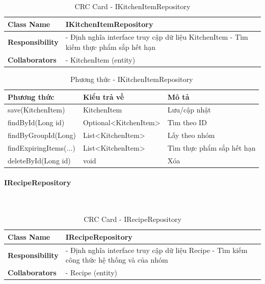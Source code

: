 \begin{table}[H]
\small
\renewcommand{\arraystretch}{1.3}
\begin{tabularx}{\textwidth}{|>{\raggedright\arraybackslash}p{3.5cm}|X|}
\hline
\rowcolor{gray!20}
\textbf{Class Name} & IKitchenItemRepository \\
\hline
\textbf{Responsibility} & - Định nghĩa interface truy cập dữ liệu KitchenItem \newline - Tìm kiếm thực phẩm sắp hết hạn \\
\hline
\textbf{Collaborators} & - KitchenItem (entity) \\
\hline
\end{tabularx}
\caption{CRC Card - IKitchenItemRepository}
\end{table}

\begin{table}[H]
\small
\renewcommand{\arraystretch}{1.3}
\begin{tabularx}{\textwidth}{|>{\raggedright\arraybackslash}p{5cm}|>{\raggedright\arraybackslash}p{3.5cm}|X|}
\hline
\rowcolor{gray!20}
\textbf{Phương thức} & \textbf{Kiểu trả về} & \textbf{Mô tả} \\
\hline
save(KitchenItem) & KitchenItem & Lưu/cập nhật \\
\hline
findById(Long id) & Optional<KitchenItem> & Tìm theo ID \\
\hline
findByGroupId(Long) & List<KitchenItem> & Lấy theo nhóm \\
\hline
findExpiringItems(...) & List<KitchenItem> & Tìm thực phẩm sắp hết hạn \\
\hline
deleteById(Long id) & void & Xóa \\
\hline
\end{tabularx}
\caption{Phương thức - IKitchenItemRepository}
\end{table}

\paragraph{IRecipeRepository} ~\\

\begin{table}[H]
\small
\renewcommand{\arraystretch}{1.3}
\begin{tabularx}{\textwidth}{|>{\raggedright\arraybackslash}p{3.5cm}|X|}
\hline
\rowcolor{gray!20}
\textbf{Class Name} & IRecipeRepository \\
\hline
\textbf{Responsibility} & - Định nghĩa interface truy cập dữ liệu Recipe \newline - Tìm kiếm công thức hệ thống và của nhóm \\
\hline
\textbf{Collaborators} & - Recipe (entity) \\
\hline
\end{tabularx}
\caption{CRC Card - IRecipeRepository}
\end{table}

